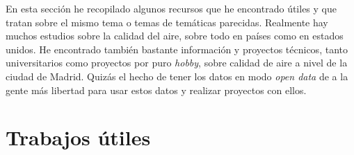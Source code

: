 
En esta sección he recopilado algunos recursos que he encontrado útiles y que tratan sobre el mismo tema o temas de temáticas parecidas. Realmente hay muchos estudios sobre la calidad del aire, sobre todo en países como en estados unidos. He encontrado también bastante información y proyectos técnicos, tanto universitarios como proyectos por puro \textit{hobby}, sobre calidad de aire a nivel de la ciudad de Madrid. Quizás el hecho de tener los datos en modo \textit{open data} de a la gente más libertad para usar estos datos y realizar proyectos con ellos.

\section{Trabajos útiles}

